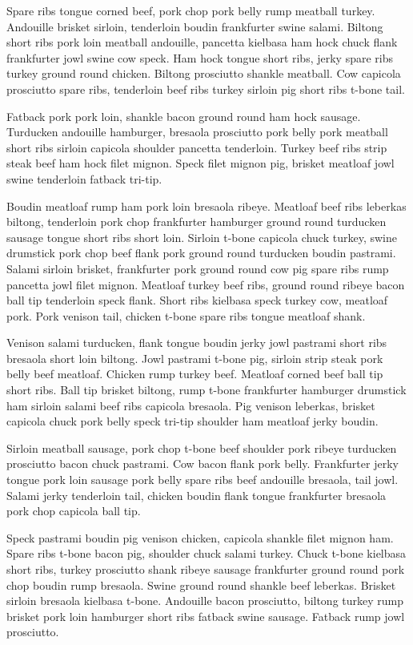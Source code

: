 Spare ribs tongue corned beef, pork chop pork belly rump meatball turkey. Andouille brisket sirloin, tenderloin boudin frankfurter swine salami. Biltong short ribs pork loin meatball andouille, pancetta kielbasa ham hock chuck flank frankfurter jowl swine cow speck. Ham hock tongue short ribs, jerky spare ribs turkey ground round chicken. Biltong prosciutto shankle meatball. Cow capicola prosciutto spare ribs, tenderloin beef ribs turkey sirloin pig short ribs t-bone tail.

Fatback pork pork loin, shankle bacon ground round ham hock sausage. Turducken andouille hamburger, bresaola prosciutto pork belly pork meatball short ribs sirloin capicola shoulder pancetta tenderloin. Turkey beef ribs strip steak beef ham hock filet mignon. Speck filet mignon pig, brisket meatloaf jowl swine tenderloin fatback tri-tip.

Boudin meatloaf rump ham pork loin bresaola ribeye. Meatloaf beef ribs leberkas biltong, tenderloin pork chop frankfurter hamburger ground round turducken sausage tongue short ribs short loin. Sirloin t-bone capicola chuck turkey, swine drumstick pork chop beef flank pork ground round turducken boudin pastrami. Salami sirloin brisket, frankfurter pork ground round cow pig spare ribs rump pancetta jowl filet mignon. Meatloaf turkey beef ribs, ground round ribeye bacon ball tip tenderloin speck flank. Short ribs kielbasa speck turkey cow, meatloaf pork. Pork venison tail, chicken t-bone spare ribs tongue meatloaf shank.

Venison salami turducken, flank tongue boudin jerky jowl pastrami short ribs bresaola short loin biltong. Jowl pastrami t-bone pig, sirloin strip steak pork belly beef meatloaf. Chicken rump turkey beef. Meatloaf corned beef ball tip short ribs. Ball tip brisket biltong, rump t-bone frankfurter hamburger drumstick ham sirloin salami beef ribs capicola bresaola. Pig venison leberkas, brisket capicola chuck pork belly speck tri-tip shoulder ham meatloaf jerky boudin.

Sirloin meatball sausage, pork chop t-bone beef shoulder pork ribeye turducken prosciutto bacon chuck pastrami. Cow bacon flank pork belly. Frankfurter jerky tongue pork loin sausage pork belly spare ribs beef andouille bresaola, tail jowl. Salami jerky tenderloin tail, chicken boudin flank tongue frankfurter bresaola pork chop capicola ball tip.

Speck pastrami boudin pig venison chicken, capicola shankle filet mignon ham. Spare ribs t-bone bacon pig, shoulder chuck salami turkey. Chuck t-bone kielbasa short ribs, turkey prosciutto shank ribeye sausage frankfurter ground round pork chop boudin rump bresaola. Swine ground round shankle beef leberkas. Brisket sirloin bresaola kielbasa t-bone. Andouille bacon prosciutto, biltong turkey rump brisket pork loin hamburger short ribs fatback swine sausage. Fatback rump jowl prosciutto.

